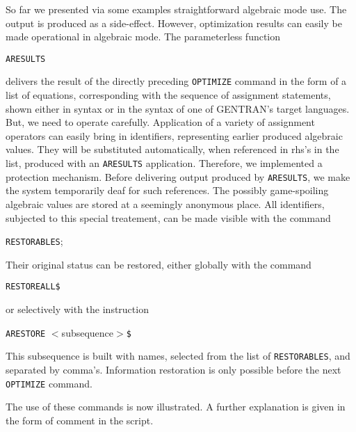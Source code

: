 So far we presented via some examples straightforward
algebraic mode use. The output is produced as a side-effect. However,
optimization results can easily be made operational in algebraic mode.
The parameterless function 

\hspace*{1cm} {\tt ARESULTS} 

delivers the result of the directly
preceding {\tt OPTIMIZE} command in the form of a list of equations,
corresponding with the sequence of assignment statements, shown either in
{\REDUCE} syntax or in the syntax of one of GENTRAN's target languages.
But, we need to operate carefully. Application of a variety of assignment 
operators can easily bring in identifiers, representing earlier produced
algebraic values. They will be substituted automatically, when referenced in 
rhs's in the list, produced with an {\tt ARESULTS} application. 
Therefore, we implemented a
protection mechanism. Before delivering output produced by {\tt ARESULTS},
we make the system temporarily deaf for such references. The
possibly game-spoiling algebraic values are stored at a seemingly 
anonymous place. All
identifiers, subjected to this special treatement, can be made visible with
the command 

\hspace*{1cm} {\tt RESTORABLES};

Their original status can be restored, either globally with the command 

\hspace*{1cm} {\tt RESTOREALL}\verb+$+ 

or selectively with the instruction 

\hspace*{1cm} {\tt ARESTORE} $<$subsequence$>$\verb+$+ 

This subsequence is built with names, selected  from the list 
of {\tt RESTORABLES}, and separated by comma's. Information restoration 
is only possible before the next {\tt OPTIMIZE} command.

\example\label{ex:3.1.9}

The use of these commands is now illustrated.
A further explanation is given in the form of comment in the script. 

